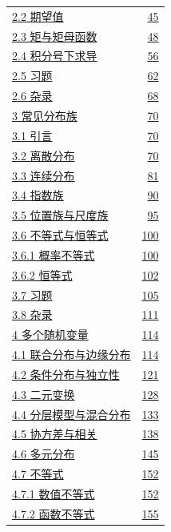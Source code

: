 \begin{longtable}{@{}p{}r@{}}
\hyperref[sec:2.2]{2.2 期望值} & \hyperref[sec:2.2]{45} \\
\hyperref[sec:2.3]{2.3 矩与矩母函数} & \hyperref[sec:2.3]{48} \\
\hyperref[sec:2.4]{2.4 积分号下求导} & \hyperref[sec:2.4]{56} \\
\hyperref[sec:2.5]{2.5 习题} & \hyperref[sec:2.5]{62} \\
\hyperref[sec:2.6]{2.6 杂录} & \hyperref[sec:2.6]{68} \\
\hyperref[sec:3]{3 常见分布族} & \hyperref[sec:3]{70} \\
\hyperref[sec:3.1]{3.1 引言} & \hyperref[sec:3.1]{70} \\
\hyperref[sec:3.2]{3.2 离散分布} & \hyperref[sec:3.2]{70} \\
\hyperref[sec:3.3]{3.3 连续分布} & \hyperref[sec:3.3]{81} \\
\hyperref[sec:3.4]{3.4 指数族} & \hyperref[sec:3.4]{90} \\
\hyperref[sec:3.5]{3.5 位置族与尺度族} & \hyperref[sec:3.5]{95} \\
\hyperref[sec:3.6]{3.6 不等式与恒等式} & \hyperref[sec:3.6]{100} \\
\hyperref[sec:3.6.1]{3.6.1 概率不等式} & \hyperref[sec:3.6.1]{100} \\
\hyperref[sec:3.6.2]{3.6.2 恒等式} & \hyperref[sec:3.6.2]{102} \\
\hyperref[sec:3.7]{3.7 习题} & \hyperref[sec:3.7]{105} \\
\hyperref[sec:3.8]{3.8 杂录} & \hyperref[sec:3.8]{111} \\
\hyperref[sec:4]{4 多个随机变量} & \hyperref[sec:4]{114} \\
\hyperref[sec:4.1]{4.1 联合分布与边缘分布} & \hyperref[sec:4.1]{114} \\
\hyperref[sec:4.2]{4.2 条件分布与独立性} & \hyperref[sec:4.2]{121} \\
\hyperref[sec:4.3]{4.3 二元变换} & \hyperref[sec:4.3]{128} \\
\hyperref[sec:4.4]{4.4 分层模型与混合分布} & \hyperref[sec:4.4]{133} \\
\hyperref[sec:4.5]{4.5 协方差与相关} & \hyperref[sec:4.5]{138} \\
\hyperref[sec:4.6]{4.6 多元分布} & \hyperref[sec:4.6]{145} \\
\hyperref[sec:4.7]{4.7 不等式} & \hyperref[sec:4.7]{152} \\
\hyperref[sec:4.7.1]{4.7.1 数值不等式} & \hyperref[sec:4.7.1]{152} \\
\hyperref[sec:4.7.2]{4.7.2 函数不等式} & \hyperref[sec:4.7.2]{155} \\

\end{longtable}
